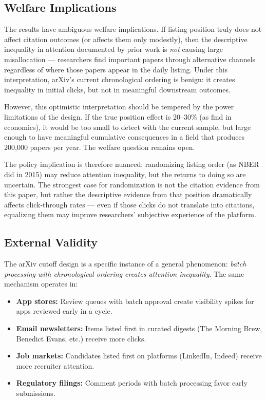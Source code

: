 \documentclass[12pt]{article}
\begin{document}
\subsection{Welfare Implications}

The results have ambiguous welfare implications. If listing position truly does not affect citation outcomes (or affects them only modestly), then the descriptive inequality in attention documented by prior work is \textit{not} causing large misallocation --- researchers find important papers through alternative channels regardless of where those papers appear in the daily listing. Under this interpretation, arXiv's current chronological ordering is benign: it creates inequality in initial clicks, but not in meaningful downstream outcomes.

However, this optimistic interpretation should be tempered by the power limitations of the design. If the true position effect is 20--30\% (as \citet{feenberg2017} find in economics), it would be too small to detect with the current sample, but large enough to have meaningful cumulative consequences in a field that produces 200,000 papers per year. The welfare question remains open.

The policy implication is therefore nuanced: randomizing listing order (as NBER did in 2015) may reduce attention inequality, but the returns to doing so are uncertain. The strongest case for randomization is not the citation evidence from this paper, but rather the descriptive evidence from \citet{haque2009} that position dramatically affects click-through rates --- even if those clicks do not translate into citations, equalizing them may improve researchers' subjective experience of the platform.

\subsection{External Validity}

The arXiv cutoff design is a specific instance of a general phenomenon: \textit{batch processing with chronological ordering creates attention inequality}. The same mechanism operates in:

\begin{itemize}
\item \textbf{App stores:} Review queues with batch approval create visibility spikes for apps reviewed early in a cycle.
\item \textbf{Email newsletters:} Items listed first in curated digests (The Morning Brew, Benedict Evans, etc.) receive more clicks.
\item \textbf{Job markets:} Candidates listed first on platforms (LinkedIn, Indeed) receive more recruiter attention.
\item \textbf{Regulatory filings:} Comment periods with batch processing favor early submissions.
\end{itemize}
\end{document}
